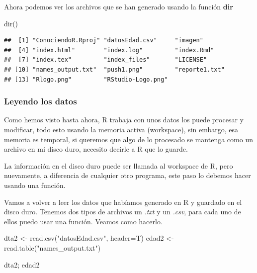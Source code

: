 \documentclass[
]{article}
\newenvironment{Shaded}{\begin{snugshade}}{\end{snugshade}}
\newcommand{\AttributeTok}[1]{\textcolor[rgb]{0.77,0.63,0.00}{#1}}
\newcommand{\FunctionTok}[1]{\textcolor[rgb]{0.00,0.00,0.00}{#1}}
\newcommand{\NormalTok}[1]{#1}
\newcommand{\OtherTok}[1]{\textcolor[rgb]{0.56,0.35,0.01}{#1}}
\newcommand{\StringTok}[1]{\textcolor[rgb]{0.31,0.60,0.02}{#1}}
\begin{document}
Ahora podemos ver los archivos que se han generado usando la función
\textbf{dir}

\begin{Shaded}
\begin{Highlighting}[]
\FunctionTok{dir}\NormalTok{()}
\end{Highlighting}
\end{Shaded}

\begin{verbatim}
##  [1] "ConociendoR.Rproj" "datosEdad.csv"     "imagen"           
##  [4] "index.html"        "index.log"         "index.Rmd"        
##  [7] "index.tex"         "index_files"       "LICENSE"          
## [10] "names_output.txt"  "push1.png"         "reporte1.txt"     
## [13] "Rlogo.png"         "RStudio-Logo.png"
\end{verbatim}

\hypertarget{leyendo-los-datos}{%
\subsubsection{Leyendo los datos}\label{leyendo-los-datos}}

Como hemos visto hasta ahora, R trabaja con unos datos los puede
procesar y modificar, todo esto usando la memoria activa (workspace),
sin embargo, esa memoria es temporal, si queremos que algo de lo
procesado se mantenga como un archivo en mi disco duro, necesito decirle
a R que lo guarde.

La información en el disco duro puede ser llamada al workspace de R,
pero nuevamente, a diferencia de cualquier otro programa, este paso lo
debemos hacer usando una función.

Vamos a volver a leer los datos que habíamos generado en R y guardado en
el disco duro. Tenemos dos tipos de archivos un \emph{.txt} y un
\emph{.csv}, para cada uno de ellos puedo usar una función. Veamos como
hacerlo.

\begin{Shaded}
\begin{Highlighting}[]
\NormalTok{dta2 }\OtherTok{\textless{}{-}} \FunctionTok{read.csv}\NormalTok{(}\StringTok{"datosEdad.csv"}\NormalTok{, }\AttributeTok{header=}\NormalTok{T)}
\NormalTok{edad2 }\OtherTok{\textless{}{-}} \FunctionTok{read.table}\NormalTok{(}\StringTok{"names\_output.txt"}\NormalTok{)}

\NormalTok{dta2; edad2}
\end{Highlighting}
\end{Shaded}
\end{document}
